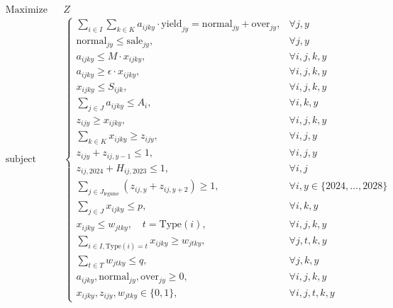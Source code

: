\begin{equation}
\begin{aligned}
    & \text{Maximize}   && Z \\
    & \text{subject to} && 
    \begin{cases}
        \sum_{i \in I} \sum_{k \in K} a_{ijky} \cdot \text{yield}_{jy} = \text{normal}_{jy} + \text{over}_{jy}, & \forall j, y \\
        \text{normal}_{jy} \le \text{sale}_{jy},                                                              & \forall j, y \\
        a_{ijky} \le M \cdot x_{ijky},                                                                       & \forall i, j, k, y \\
        a_{ijky} \ge \epsilon \cdot x_{ijky},                                                                & \forall i, j, k, y \\
        x_{ijky} \le S_{ijk},                                                                                & \forall i, j, k, y \\
        \sum_{j \in J} a_{ijky} \le A_i,                                                                     & \forall i, k, y \\
        z_{ijy} \ge x_{ijky},                                                                                & \forall i, j, k, y \\
        \sum_{k \in K} x_{ijky} \ge z_{ijy},                                                                 & \forall i, j, y \\
        z_{ijy} + z_{ij,y-1} \le 1,                                                                          & \forall i, j, y \\
        z_{ij,2024} + H_{ij,2023} \le 1,                                                                     & \forall i, j \\
        \sum_{j \in J_{\text{legume}}} (z_{ij,y} + z_{ij,y+2}) \ge 1, & \forall i, y \in \{2024, \dots, 2028\} \\
        \sum_{j \in J} x_{ijky} \le p,                                                                       & \forall i, k, y \\
        x_{ijky} \le w_{jtky}, \quad t = \text{Type}(i),                                                      & \forall i, j, k, y \\
        \sum_{i \in I, \text{Type}(i)=t} x_{ijky} \ge w_{jtky},                                              & \forall j, t, k, y \\
        \sum_{t \in T} w_{jtky} \le q,                                                                       & \forall j, k, y \\
        a_{ijky}, \text{normal}_{jy}, \text{over}_{jy} \ge 0,                                                 & \forall i, j, k, y \\
        x_{ijky}, z_{ijy}, w_{jtky} \in \{0, 1\},                                                             & \forall i, j, t, k, y
    \end{cases}
\end{aligned}
\end{equation}




